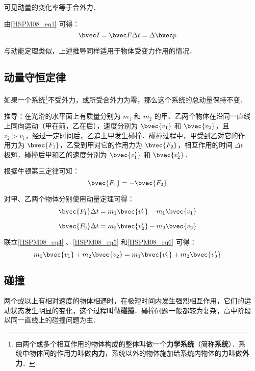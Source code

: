 可见动量的变化率等于合外力．

由\autoref{HSPM08_eq1} 可得：
\begin{equation}\label{HSPM08_eq3}
\bvec I=\bvec F\Delta t=\Delta \bvec p
\end{equation}

与动能定理类似，上述推导同样适用于物体受变力作用的情况．

\subsection{动量守恒定律}

如果一个系统\footnote{由两个或多个相互作用的物体构成的整体叫做一个\textbf{力学系统}（简称\textbf{系统}）．系统中物体间的作用力叫做\textbf{内力}，系统以外的物体施加给系统内物体的力叫做\textbf{外力}．}不受外力，或所受合外力为零，那么这个系统的总动量保持不变．

推导：在光滑的水平面上有质量分别为 $m_1$ 和 $m_2$ 的甲、乙两个物体在沿同一直线上同向运动（甲在前，乙在后），速度分别为 $\bvec{v_1}$ 和 $\bvec{v_2}$，且 $v_2>v_1$，经过一定时间后，乙追上甲发生碰撞．碰撞过程中，甲受到乙对它的作用力为 $\bvec {F_1}$，乙受到甲对它的作用力为 $\bvec {F_2}$，相互作用的时间 $\Delta t$ 极短．碰撞后甲和乙的速度分别为 $\bvec{v_1'}$ 和 $\bvec{v_2'}$．

根据牛顿第三定律可知：
\begin{equation}\label{HSPM08_eq4}
\bvec {F_1}=-\bvec{F_2}
\end{equation}

对甲、乙两个物体分别使用动量定理可得：
\begin{equation}\label{HSPM08_eq5}
\bvec{F_1}\Delta t=m_1\bvec{v_1'}-m_1\bvec{v_1}
\end{equation}

\begin{equation}\label{HSPM08_eq6}
\bvec{F_2}\Delta t=m_2\bvec{v_2'}-m_2\bvec{v_2}
\end{equation}

联立\autoref{HSPM08_eq4} 、\autoref{HSPM08_eq5} 和\autoref{HSPM08_eq6} 可得：
\begin{equation}
m_1\bvec{v_1}+ m_2\bvec{v_2}= m_1\bvec{v_1'}+ m_2\bvec{v_2'}
\end{equation}

\subsection{碰撞}

两个或以上有相对速度的物体相遇时，在极短时间内发生强烈相互作用，它们的运动状态发生明显的变化，这个过程叫做\textbf{碰撞}．碰撞问题一般都较为复杂，高中阶段以同一直线上的碰撞问题为主．


